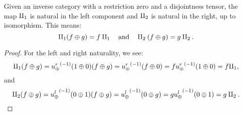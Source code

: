 \begin{lemma}\label{lem:disjointness_tensor_has_injections}
  Given an inverse category \X with a restriction zero and a disjointness tensor, the map $\amalg_{1}$ is
  natural in the left component and $\amalg_{2}$ is natural in the right, up to isomorphism. This means:
  \[
    \amalg_{1} (f\oplus g) = f \amalg_{1} \quad\text{and}\quad \amalg_{2} (f\oplus g) = g \amalg_{2}.
  \]
\end{lemma}
\begin{proof}
  For the left and right naturality, we see:
  \[
    \amalg_{1} (f\oplus g) = {u_{\oplus}^r}^{(-1)} (1\oplus0) (f\oplus g) = {u_{\oplus}^r}^{(-1)} (f \oplus 0) =
      f {u_{\oplus}^r}^{(-1)} (1\oplus0) = f \amalg_{1},
  \]
  and
  \[
    \amalg_{2} (f\oplus g) = {u_{\oplus}^l}^{(-1)} (0\oplus1) (f\oplus g) = {u_{\oplus}^l}^{(-1)} (0 \oplus g) =
      g {u_{\oplus}^l}^{(-1)} (0\oplus1) = g \amalg_{2}.
  \]
\end{proof}



